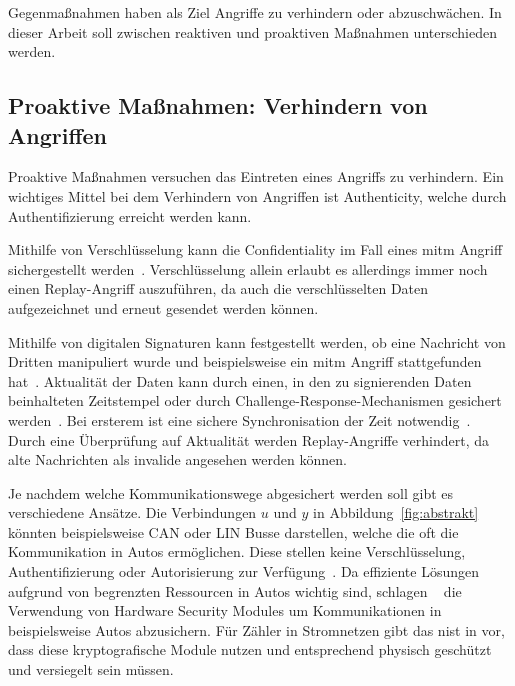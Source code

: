\documentclass[final,bibliography=totocnumbered]{include/sikseminar}
\begin{document}
    Gegenmaßnahmen haben als Ziel Angriffe zu verhindern oder abzuschwächen.
    In dieser Arbeit soll zwischen reaktiven und proaktiven Maßnahmen unterschieden werden.

    \subsection{Proaktive Maßnahmen: Verhindern von Angriffen}
    \label{subsec:proactive}
    Proaktive Maßnahmen versuchen das Eintreten eines Angriffs zu verhindern.
    Ein wichtiges Mittel bei dem Verhindern von Angriffen ist Authenticity, welche durch Authentifizierung erreicht werden kann.

    Mithilfe von Verschlüsselung kann die Confidentiality im Fall eines \gls{mitm} Angriff sichergestellt werden~\cite{HLL+17}.
    Verschlüsselung allein erlaubt es allerdings immer noch einen Replay-Angriff auszuführen, da auch die verschlüsselten Daten aufgezeichnet und erneut gesendet werden können.

    Mithilfe von digitalen Signaturen kann festgestellt werden, ob eine Nachricht von Dritten manipuliert wurde und beispielsweise ein \gls{mitm} Angriff stattgefunden hat~\cite{CAS08}.
    Aktualität der Daten kann durch einen, in den zu signierenden Daten beinhalteten Zeitstempel oder durch Challenge-Response-Mechanismen gesichert werden~\cite{CAS08}.
    Bei ersterem ist eine sichere Synchronisation der Zeit notwendig~\cite{CAS08}.
    Durch eine Überprüfung auf Aktualität werden Replay-Angriffe verhindert, da alte Nachrichten als invalide angesehen werden können.


    Je nachdem welche Kommunikationswege abgesichert werden soll gibt es verschiedene Ansätze.
    Die Verbindungen $u$ und $y$ in Abbildung~\ref{fig:abstrakt} könnten beispielsweise CAN oder LIN Busse darstellen, welche die oft die Kommunikation in Autos ermöglichen.
    Diese stellen keine Verschlüsselung, Authentifizierung oder Autorisierung zur Verfügung~\cite{HLL+17}.
    Da effiziente Lösungen aufgrund von begrenzten Ressourcen in Autos wichtig sind, schlagen \citeauthor{WG12}~\cite{WG12} die Verwendung von Hardware Security Modules um Kommunikationen in beispielsweise Autos abzusichern.
    Für Zähler in Stromnetzen gibt das \gls{nist} in \cite{PB14} vor, dass diese kryptografische Module nutzen und entsprechend physisch geschützt und versiegelt sein müssen.
\end{document}
